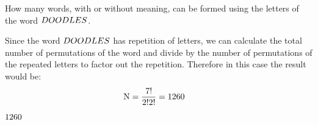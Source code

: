 



\question[2] How many words, with or without meaning, can be formed
using the letters of the word $DOODLES$.



\watchout

\ifprintanswers
\fi 

\begin{solution}[\mcq]
  Since the word $DOODLES$ has repetition of letters, we can calculate the
  total number of permutations of the word and divide by the number of
  permutations of the repeated letters to factor out the repetition.
  Therefore in this case the result would be:
  \begin{align}
  	\text{N} &= \dfrac{7!}{2!2!} = 1260
  \end{align}

\end{solution}

\ifprintanswers\begin{codex}$1260$\end{codex}\fi

